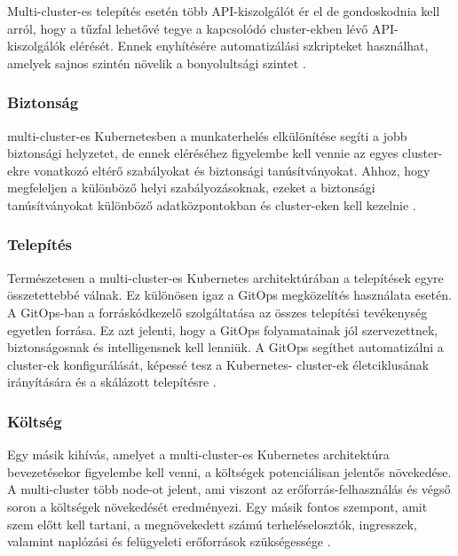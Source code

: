 Multi-cluster-es telepítés esetén több API-kiszolgálót ér el de gondoskodnia kell arról, hogy a tűzfal lehetővé tegye a kapcsolódó cluster-ekben lévő API-kiszolgálók elérését.
Ennek enyhítésére automatizálási szkripteket használhat, amelyek sajnos szintén növelik a bonyolultsági szintet \cite{multicluster}.

\subsubsection*{Biztonság}
multi-cluster-es Kubernetesben a munkaterhelés elkülönítése segíti a jobb biztonsági helyzetet, de ennek eléréséhez figyelembe kell vennie az egyes cluster-ekre vonatkozó eltérő szabályokat és biztonsági tanúsítványokat.
Ahhoz, hogy megfeleljen a különböző helyi szabályozásoknak, ezeket a biztonsági tanúsítványokat különböző adatközpontokban és cluster-eken kell kezelnie \cite{multicluster}.

\subsubsection*{Telepítés}
Természetesen a multi-cluster-es Kubernetes architektúrában a telepítések egyre összetettebbé válnak.
Ez különösen igaz a GitOps megközelítés használata esetén. A GitOps-ban a forráskódkezelő szolgáltatása az összes telepítési tevékenység egyetlen forrása.
Ez azt jelenti, hogy a GitOps folyamatainak jól szervezettnek, biztonságosnak és intelligensnek kell lenniük.
A GitOps segíthet automatizálni a cluster-ek konfigurálását, képessé tesz a Kubernetes- cluster-ek életciklusának irányítására és a skálázott telepítésre \cite{multicluster}.

\subsubsection*{Költség}
Egy másik kihívás, amelyet a multi-cluster-es Kubernetes architektúra bevezetésekor figyelembe kell venni, a költségek potenciálisan jelentős növekedése.
A multi-cluster több node-ot jelent, ami viszont az erőforrás-felhasználás és végső soron a költségek növekedését eredményezi.
Egy másik fontos szempont, amit szem előtt kell tartani, a megnövekedett számú terheléselosztók, ingresszek, valamint naplózási és felügyeleti erőforrások szükségessége \cite{multicluster}.